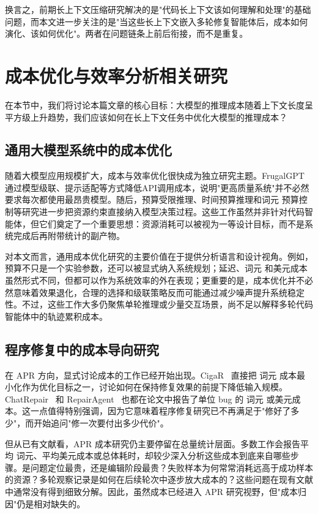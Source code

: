 换言之，前期长上下文压缩研究解决的是"代码长上下文该如何理解和处理"的基础问题，而本文进一步关注的是"当这些长上下文嵌入多轮修复智能体后，成本如何演化、该如何优化"。两者在问题链条上前后衔接，而不是重复。

\section{成本优化与效率分析相关研究}
在本节中，我们将讨论本篇文章的核心目标：大模型的推理成本随着上下文长度呈平方级上升趋势，我们应该如何在长上下文任务中优化大模型的推理成本？

\subsection{通用大模型系统中的成本优化}

随着大模型应用规模扩大，成本与效率优化很快成为独立研究主题。FrugalGPT~\cite{chen2023frugalgpt} 通过模型级联、提示适配等方式降低API调用成本，说明"更高质量系统"并不必然要求每次都使用最昂贵模型。随后，预算受限推理、时间预算推理和词元 预算控制等研究进一步把资源约束直接纳入模型决策过程。这些工作虽然并非针对代码智能体，但它们奠定了一个重要思想：资源消耗可以被视为一等设计目标，而不是系统完成后再附带统计的副产物。

对本文而言，通用成本优化研究的主要价值在于提供分析语言和设计视角。例如，预算不只是一个实验参数，还可以被显式纳入系统规划；延迟、词元 和美元成本虽然形式不同，但都可以作为系统效率的外在表现；更重要的是，成本优化并不必然意味着效果退化，合理的选择和级联策略反而可能通过减少噪声提升系统稳定性。不过，这些工作大多仍聚焦单轮推理或少量交互场景，尚不足以解释多轮代码智能体中的轨迹累积成本。

\subsection{程序修复中的成本导向研究}

在 APR 方向，显式讨论成本的工作已经开始出现。CigaR~\cite{hidvegi2024cigar} 直接把 词元 成本最小化作为优化目标之一，讨论如何在保持修复效果的前提下降低输入规模。ChatRepair~\cite{xia2024keep} 和 RepairAgent~\cite{bouzenia2024repairagent} 也都在论文中报告了单位 bug 的 词元 或美元成本。这一点值得特别强调，因为它意味着程序修复研究已不再满足于"修好了多少"，而开始追问"修一次要付出多少代价"。

但从已有文献看，APR 成本研究仍主要停留在总量统计层面。多数工作会报告平均 词元、平均美元成本或总体耗时，却较少深入分析这些成本到底来自哪些步骤。是问题定位最贵，还是编辑阶段最贵？失败样本为何常常消耗远高于成功样本的资源？多轮观察记录是如何在后续轮次中逐步放大成本的？这些问题在现有文献中通常没有得到细致分解。因此，虽然成本已经进入 APR 研究视野，但"成本归因"仍是相对缺失的。

